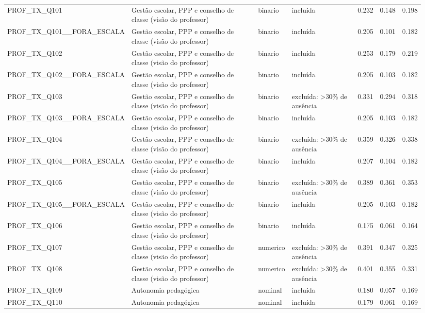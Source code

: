 \begin{tabular}{llllrrr}
PROF\_TX\_Q101 & Gestão escolar, PPP e conselho de classe (visão do professor) & binario & incluída & 0.232 & 0.148 & 0.198 \\
PROF\_TX\_Q101\_\_FORA\_ESCALA & Gestão escolar, PPP e conselho de classe (visão do professor) & binario & incluída & 0.205 & 0.101 & 0.182 \\
PROF\_TX\_Q102 & Gestão escolar, PPP e conselho de classe (visão do professor) & binario & incluída & 0.253 & 0.179 & 0.219 \\
PROF\_TX\_Q102\_\_FORA\_ESCALA & Gestão escolar, PPP e conselho de classe (visão do professor) & binario & incluída & 0.205 & 0.103 & 0.182 \\
PROF\_TX\_Q103 & Gestão escolar, PPP e conselho de classe (visão do professor) & binario & excluída: >30\% de ausência & 0.331 & 0.294 & 0.318 \\
PROF\_TX\_Q103\_\_FORA\_ESCALA & Gestão escolar, PPP e conselho de classe (visão do professor) & binario & incluída & 0.205 & 0.103 & 0.182 \\
PROF\_TX\_Q104 & Gestão escolar, PPP e conselho de classe (visão do professor) & binario & excluída: >30\% de ausência & 0.359 & 0.326 & 0.338 \\
PROF\_TX\_Q104\_\_FORA\_ESCALA & Gestão escolar, PPP e conselho de classe (visão do professor) & binario & incluída & 0.207 & 0.104 & 0.182 \\
PROF\_TX\_Q105 & Gestão escolar, PPP e conselho de classe (visão do professor) & binario & excluída: >30\% de ausência & 0.389 & 0.361 & 0.353 \\
PROF\_TX\_Q105\_\_FORA\_ESCALA & Gestão escolar, PPP e conselho de classe (visão do professor) & binario & incluída & 0.205 & 0.103 & 0.182 \\
PROF\_TX\_Q106 & Gestão escolar, PPP e conselho de classe (visão do professor) & binario & incluída & 0.175 & 0.061 & 0.164 \\
PROF\_TX\_Q107 & Gestão escolar, PPP e conselho de classe (visão do professor) & numerico & excluída: >30\% de ausência & 0.391 & 0.347 & 0.325 \\
PROF\_TX\_Q108 & Gestão escolar, PPP e conselho de classe (visão do professor) & numerico & excluída: >30\% de ausência & 0.401 & 0.355 & 0.331 \\
PROF\_TX\_Q109 & Autonomia pedagógica & nominal & incluída & 0.180 & 0.057 & 0.169 \\
PROF\_TX\_Q110 & Autonomia pedagógica & nominal & incluída & 0.179 & 0.061 & 0.169 \\

\end{tabular}
